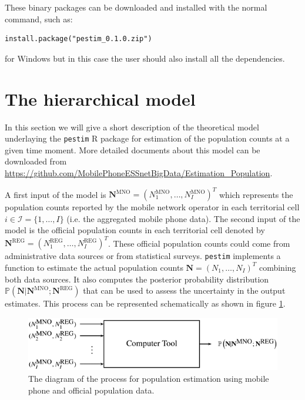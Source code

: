 \documentclass[12pt, a4paper]{article}
\begin{document}
These binary packages can be downloaded and installed with the normal command, such as:
\begin{verbatim}
install.package("pestim_0.1.0.zip")
\end{verbatim}
for Windows but in this case the user should also install all the dependencies.

\section{The hierarchical model}\label{model}

In this section we will give a short description of the theoretical model 
underlaying the \texttt{pestim} R package for estimation of the population 
counts at a given time moment. More detailed documents about this model can be downloaded from 
\url{https://github.com/MobilePhoneESSnetBigData/Estimation_Population}.

A first input of the model is 
$\mathbf{N}^{\textrm{MNO}}=(N_{1}^{\textrm{MNO}}, \dots, N_{I}^{\textrm{MNO}})^{T}$ which 
represents the population counts reported by the mobile network operator in 
each territorial cell $i\in\mathcal{I}=\{1,\dots,I\}$ (i.e. the aggregated mobile phone data). 
The second input of the model is the official population counts in each territorial cell denoted by 
$\mathbf{N}^{\textrm{REG}}=(N_{1}^{\textrm{REG}}, \dots, N_{I}^{\textrm{REG}})^{T}$. 
These official population counts could come from administrative data sources or from statistical surveys.
\texttt{pestim} implements a function to estimate the actual population 
counts $\mathbf{N}=(N_{1}, \dots, N_{I})^{T}$ combining both data sources. 
It also computes the posterior probability distribution 
$\mathbb{P}\left(\mathbf{N}|\mathbf{N}^{\textrm{MNO}};\mathbf{N}^{\textrm{REG}}\right)$ 
that can be used to assess the uncertainty in the output estimates.
This process can be represented schematically as shown in figure \ref{Tool}.


\begin{figure}[htbp]
\centering
\includegraphics[scale=0.75]{Tool.png}
\caption{The diagram of the process for population estimation using mobile phone and official population data.}
\label{Tool} 
\end{figure}
\end{document}
